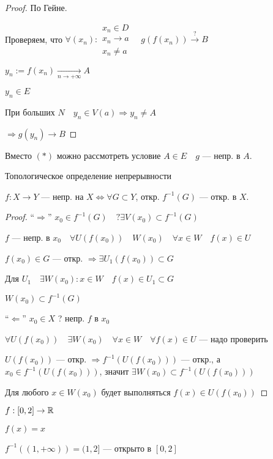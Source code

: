     \begin{proof}
        По Гейне.

        Проверяем, что $\forall (x_n): \substack{x_n\in D \\ x_n\to a \\ x_n\not=a} \quad g(f(x_n))\xrightarrow{?} B$

        $y_n:=f(x_n)\xrightarrow[n\to+\infty]{} A$

        $y_n\in E$

        При больших $N\quad y_n\in V(a) \Rightarrow y_n\not=A$

        $\Rightarrow g(y_n)\to B$
    \end{proof}
    \begin{remark}
        Вместо $(*)$ можно рассмотреть условие $A\in E \quad g$ --- непр. в $A$.
    \end{remark}
    \begin{theorem}
        Топологическое определение непрерывности

        $f: X\to Y$ --- непр. на $X \Leftrightarrow \forall G\subset Y$, откр. $f^{-1}(G)$ --- откр. в $X$.
    \end{theorem}
    \begin{proof}
        ``$\Rightarrow$'' $x_0\in f^{-1}(G) \quad ?\exists V(x_0)\subset f^{-1}(G)$

        $f$ --- непр. в $x_0 \quad \forall U(f(x_0)) \quad W(x_0) \quad \forall x\in W \quad f(x)\in U$

        $f(x_0)\in G$ --- откр. $\Rightarrow \exists U_1(f(x_0))\subset G$

        Для $U_1 \quad \exists W(x_0):x\in W \quad f(x)\in U_1\subset G$

        $W(x_0)\subset f^{-1}(G)$

        ``$\Leftarrow$'' $x_0\in X$ ? непр. $f$ в $x_0$

        $\forall U(f(x_0)) \quad \exists W(x_0) \quad \forall x\in W \quad \forall f(x)\in U$ --- надо проверить

        $U(f(x_0))$ --- откр. $\Rightarrow f^{-1}(U(f(x_0)))$ --- откр., а $x_0\in f^{-1}(U(f(x_0)))$, значит $\exists W(x_0) \subset f^{-1}(U(f(x_0)))$

        Для любого $x\in W(x_0)$ будет выполняться $f(x)\in U(f(x_0))$
    \end{proof}
    \begin{remark}
        $f:[0, 2]\to\operatorname*{\mathbb{R}}$

        $f(x)=x$

        $f^{-1}((1, +\infty))=(1, 2]$ --- открыто в $[0, 2]$
    \end{remark}
